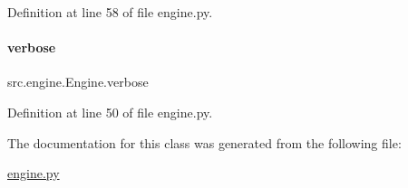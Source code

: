 Definition at line 58 of file engine.\+py.

\mbox{\label{classsrc_1_1engine_1_1Engine_a6326b913644ba439cfe65522d07e963b}} 
\paragraph{\texorpdfstring{verbose}{verbose}}
{\footnotesize\ttfamily src.\+engine.\+Engine.\+verbose}



Definition at line 50 of file engine.\+py.



The documentation for this class was generated from the following file\+:\begin{DoxyCompactItemize}
\item 
\hyperlink{engine_8py}{engine.\+py}\end{DoxyCompactItemize}
